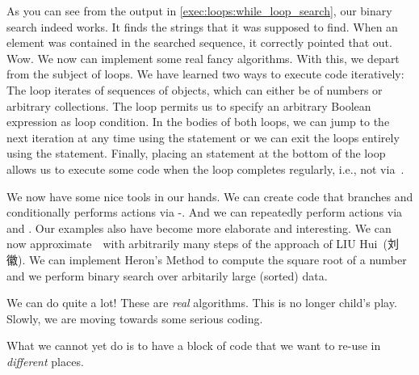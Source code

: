 As you can see from the output in \cref{exec:loops:while_loop_search}, our binary search indeed works.
It finds the strings that it was supposed to find.
When an element was contained in the searched sequence, it correctly pointed that out.
Wow.
We now can implement some real fancy algorithms.%
\endhsection%
%
%
With this, we depart from the subject of loops.
We have learned two ways to execute code iteratively:
The  loop iterates of sequences of objects, which can either be  of numbers or arbitrary collections.
The  loop permits us to specify an arbitrary Boolean expression as loop condition.
In the bodies of both loops, we can jump to the next iteration at any time using the  statement or we can exit the loops entirely using the  statement.
Finally, placing an  statement at the bottom of the loop allows us to execute some code when the loop completes regularly, i.e., not via~.

We now have some nice tools in our hands.
We can create code that branches and conditionally performs actions via -.
And we can repeatedly perform actions via  and .
Our examples also have become more elaborate and interesting.
We can now approximate~\numberPi\ with arbitrarily many steps of the approach of LIU Hui~(刘徽).
We can implement Heron's Method to compute the square root of a number and we perform binary search over arbitarily large (sorted) data.

We can do quite a lot!
These are \emph{real} algorithms.
This is no longer child's play.
Slowly, we are moving towards some serious coding.

What we cannot yet do is to have a block of code that we want to re-use in \emph{different} places.%
\endhsection%
%
\FloatBarrier%
\endhsection%
%
